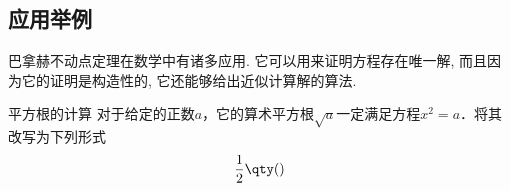 \subsection{应用举例}
巴拿赫不动点定理在数学中有诸多应用. 它可以用来证明方程存在唯一解, 而且因为它的证明是构造性的, 它还能够给出近似计算解的算法.

\begin{example}{平方根的计算}
对于给定的正数$a$，它的算术平方根$\sqrt{a}$一定满足方程$x^2=a$．将其改写为下列形式
\begin{equation}
\frac{1}{2}\qty()
\end{equation}
\end{example}
